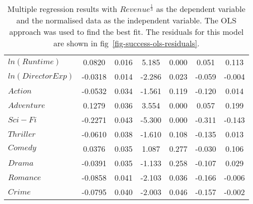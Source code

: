 \begin{table}[H]
\begin{center}
\begin{tabular}{lcccccc}
                    \textbf{$ln(Runtime)$}          & 0.0820        & 0.016            & 5.185      & 0.000               & 0.051           & 0.113           \\
                    \textbf{$ln(Director Exp)$}     & -0.0318       & 0.014            & -2.286     & 0.023               & -0.059          & -0.004          \\
                    \textbf{$Action$}               & -0.0532       & 0.034            & -1.561     & 0.119               & -0.120          & 0.014           \\
                    \textbf{$Adventure$}            & 0.1279        & 0.036            & 3.554      & 0.000               & 0.057           & 0.199           \\
                    \textbf{$Sci-Fi$}               & -0.2271       & 0.043            & -5.300     & 0.000               & -0.311          & -0.143          \\
                    \textbf{$Thriller$}             & -0.0610       & 0.038            & -1.610     & 0.108               & -0.135          & 0.013           \\
                    \textbf{$Comedy$}               & 0.0376        & 0.035            & 1.087      & 0.277               & -0.030          & 0.106           \\
                    \textbf{$Drama$}                & -0.0391       & 0.035            & -1.133     & 0.258               & -0.107          & 0.029           \\
                    \textbf{$Romance$}              & -0.0858       & 0.041            & -2.103     & 0.036               & -0.166          & -0.006          \\
                    \textbf{$Crime$}                & -0.0795       & 0.040            & -2.003     & 0.046               & -0.157          & -0.002          \\
                    \bottomrule
                \end{tabular}
            \end{center}
            \caption[short]{Multiple regression results with $Revenue^{\frac{1}{3}}$ as the dependent variable
                and the normalised data as the independent variable.
                The OLS approach was used to find the best fit.
                The residuals for this model are shown in fig~\ref{fig-success-ols-residuals}.
            }\label{tab-success-ols-summary}
        \end{table}

